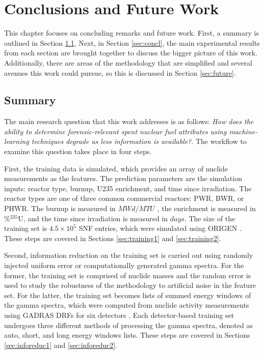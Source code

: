 \chapter{Conclusions and Future Work}
\label{ch:concl}

This chapter focuses on concluding remarks and future work.  First, a summary
is outlined in Section \ref{sec:summary}, Next, in Section \ref{sec:concl}, the
main experimental results from each section are brought together to discuss the
bigger picture of this work.  Additionally, there are areas of the methodology
that are simplified and several avenues this work could pursue, so this is
discussed in Section \ref{sec:future}.

\section{Summary}
\label{sec:summary}

The main research question that this work addresses is as follows: \textit{How
does the ability to determine forensic-relevant spent nuclear fuel attributes
using machine-learning techniques degrade as less information is available?}. 
The workflow to examine this question takes place in four steps.  

First, the training data is simulated, which provides an array of nuclide
measurements as the features. The prediction parameters are the simulation
inputs: reactor type, burnup, \gls{U235} enrichment, and time since
irradiation.  The reactor types are one of three common commercial reactors:
\gls{PWR}, \gls{BWR}, or \gls{PHWR}.  The burnup is measured in $MWd/MTU$ , the
enrichment is measured in $\%{}^{235}\text{U}$, and the time since irradiation
is measured in $days$. The size of the training set is $4.5 \times 10^5$
\gls{SNF} entries, which were simulated using \gls{ORIGEN} \cite{scale, origen,
origenarp}.  These steps are covered in Sections \ref{sec:training1} and
\ref{sec:training2}.

Second, information reduction on the training set is carried out using randomly
injected uniform error or computationally generated gamma spectra. For the
former, the training set is comprised of nuclide masses and the random error is
used to study the robustness of the methodology to artificial noise in the
feature set.  For the latter, the training set becomes lists of summed energy
windows of the gamma spectra, which were computed from nuclide activity
measurements using \gls{GADRAS} \gls{DRF}s for six detectors \cite{gadras}.
Each detector-based training set undergoes three different methods of
processing the gamma spectra, denoted as auto, short, and long energy windows
lists.  These steps are covered in Sections \ref{sec:inforeduc1} and
\ref{sec:inforeduc2}.

